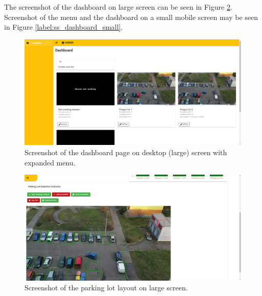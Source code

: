 \documentclass[thesis=M,english]{FITthesis}[2019/03/06]
\begin{document}
The screenshot of the dashboard on large screen can be seen in Figure \ref{label:ss_dashboard_large}. Screenshot of the menu and the dashboard on a small mobile screen may be seen in Figure \ref{label:ss_dashboard_small}.
\begin{figure}[ht!]
	\centering
	\includegraphics[scale=0.4, angle=90]{imgs/ss-dashboard.png}
	\caption{Screenshot of the dashboard page on desktop (large) screen with expanded menu.}
	\label{label:ss_dashboard_large}
\end{figure}
\begin{figure}[ht!]
	\centering
	\includegraphics[scale=0.4, angle=90]{imgs/ss-detail.png}
	\caption{Screenshot of the parking lot layout on large screen.}
	\label{label:ss_dashboard_large}
\end{figure}
\end{document}
